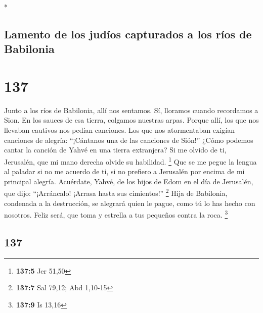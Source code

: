\begin{paracol}{2}
\begin{otherlanguage}{english}
\end{otherlanguage}

\switchcolumn[0]*

\hypertarget{lamento-de-los-juduxedos-capturados-a-los-ruxedos-de-babilonia}{%
\subsection{Lamento de los judíos capturados a los ríos de
Babilonia}\label{lamento-de-los-juduxedos-capturados-a-los-ruxedos-de-babilonia}}

\hypertarget{section-272}{%
\section{137}\label{section-272}}

 Junto a los ríos de Babilonia, allí nos sentamos. Sí,
lloramos cuando recordamos a Sion.  En los sauces de esa
tierra, colgamos nuestras arpas.  Porque allí, los que nos
llevaban cautivos nos pedían canciones. Los que nos atormentaban exigían
canciones de alegría: ``¡Cántanos una de las canciones de Sión!''
 ¿Cómo podemos cantar la canción de Yahvé en una tierra
extranjera?  Si me olvido de ti, Jerusalén, que mi mano
derecha olvide su habilidad. \footnote{\textbf{137:5} Jer 51,50}
 Que se me pegue la lengua al paladar si no me acuerdo de
ti, si no prefiero a Jerusalén por encima de mi principal alegría.
 Acuérdate, Yahvé, de los hijos de Edom en el día de
Jerusalén, que dijo: ``¡Arráncalo! ¡Arrasa hasta sus cimientos!''
\footnote{\textbf{137:7} Sal 79,12; Abd 1,10-15}  Hija de
Babilonia, condenada a la destrucción, se alegrará quien le pague, como
tú lo has hecho con nosotros.  Feliz será, que toma y
estrella a tus pequeños contra la roca. \footnote{\textbf{137:9} Is
  13,16}

\switchcolumn
\begin{otherlanguage}{english}

\hypertarget{section-273}{%
\section{137}\label{section-273}}


\end{otherlanguage}
\end{paracol}

